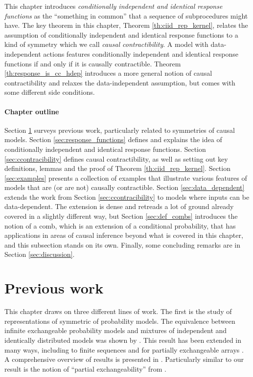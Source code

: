 This chapter introduces \emph{conditionally independent and identical response functions} as the ``something in common'' that a sequence of subprocedures might have. The key theorem in this chapter, Theorem \ref{th:ciid_rep_kernel}, relates the assumption of conditionally independent and identical response functions to a kind of symmetry which we call \emph{causal contractibility}. A model with data-independent actions features conditionally independent and identical response functions if and only if it is causally contractible. Theorem \ref{th:response_is_cc_hdep} introduces a more general notion of causal contractibility and relaxes the data-independent assumption, but comes with some different side conditions.

\paragraph{Chapter outline}

Section \ref{sec:prev_work} surveys previous work, particularly related to symmetries of causal models. Section \ref{sec:response_functions} defines and explains the idea of conditionally independent and identical response functions. Section \ref{sec:ccontracibility} defines causal contractibility, as well as setting out key definitions, lemmas and the proof of Theorem \ref{th:ciid_rep_kernel}. Section \ref{sec:examples} presents a collection of examples that illustrate various features of models that are (or are not) causally contractible. Section \ref{sec:data_dependent} extends the work from Section \ref{sec:ccontracibility} to models where inputs can be data-dependent. The extension is dense and retreads a lot of ground already covered in a slightly different way, but Section \ref{sec:def_combs} introduces the notion of a comb, which is an extension of a conditional probability, that has applications in areas of causal inference beyond what is covered in this chapter, and this subsection stands on its own. Finally, some concluding remarks are in Section \ref{sec:discussion}.

\section{Previous work}\label{sec:prev_work}

This chapter draws on three different lines of work. The first is the study of representations of symmetric of probability models. The equivalence between infinite exchangeable probability models and mixtures of independent and identically distributed models was shown by \cite{de_finetti_foresight_1992}. This result has been extended in many ways, including to finite sequences \citet{kerns_definettis_2006,diaconis_finite_1980} and for partially exchangeable arrays \citet{aldous_representations_1981}. A comprehensive overview of results is presented in \citet{kallenberg_probabilistic_2005}. Particularly similar to our result is the notion of ``partial exchangeability'' from \citet{diaconis_recent_1988}.

